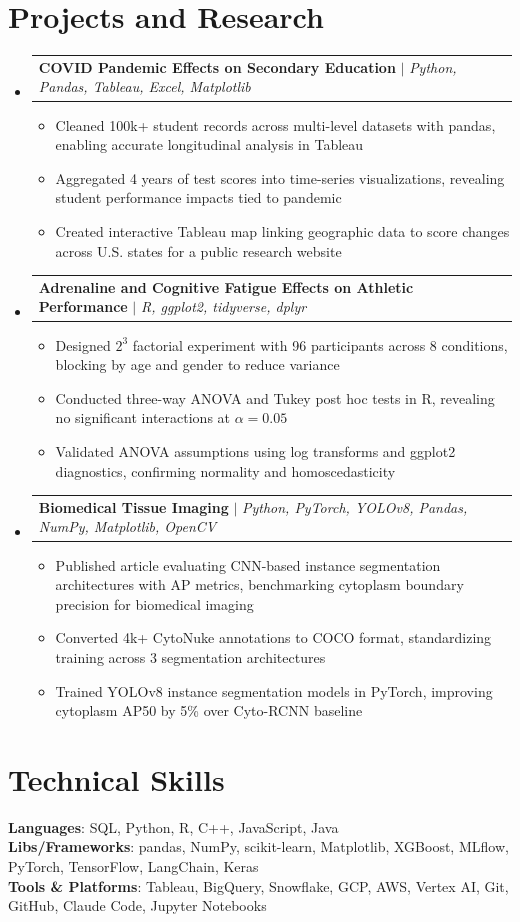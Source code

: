 \documentclass[letterpaper,11pt]{article}
\makeatletter
\newcommand{\resumeItem}[1]{
  \item\small{#1}
}
\newcommand{\resumeProjectHeading}[2]{
    \item
    \begin{tabular*}{\textwidth}{l@{\extracolsep{\fill}}r}
      #1 & #2 \\
    \end{tabular*}\vspace{-7pt}
}
\newcommand{\resumeSubHeadingListStart}{\begin{itemize}[leftmargin=0in, label={}]}
\newcommand{\resumeSubHeadingListEnd}{\end{itemize}}
\newcommand{\resumeItemListStart}{\begin{itemize}[itemsep= 1.5pt, parsep=0pt]}
\newcommand{\resumeItemListEnd}{\end{itemize}\vspace{-5pt}}
\makeatother
\begin{document}
\section{Projects and Research}
    \resumeSubHeadingListStart
      \resumeProjectHeading
          {\textbf{COVID Pandemic Effects on Secondary Education} $|$ \textit{Python, Pandas, Tableau, Excel, Matplotlib}}{}
          \resumeItemListStart
            \resumeItem{Cleaned 100k+ student records across multi-level datasets with pandas, enabling accurate longitudinal analysis in Tableau}
            \resumeItem{Aggregated 4 years of test scores into time-series visualizations, revealing student performance impacts tied to pandemic}
            \resumeItem{Created interactive Tableau map linking geographic data to score changes across U.S. states for a public research website}
          \resumeItemListEnd
      \resumeProjectHeading
          {\textbf{Adrenaline and Cognitive Fatigue Effects on Athletic Performance} $|$ \textit{R, ggplot2, tidyverse, dplyr}}{}
          \resumeItemListStart
            \resumeItem{Designed $2^3$ factorial experiment with 96 participants across 8 conditions, blocking by age and gender to reduce variance}
            \resumeItem{Conducted three-way ANOVA and Tukey post hoc tests in R, revealing no significant interactions at $\alpha = 0.05$}
            \resumeItem{Validated ANOVA assumptions using log transforms and ggplot2 diagnostics, confirming normality and homoscedasticity}
          \resumeItemListEnd
      \resumeProjectHeading
          {\textbf{Biomedical Tissue Imaging} $|$ \textit{Python, PyTorch, YOLOv8, Pandas, NumPy, Matplotlib, OpenCV}}{}
          \resumeItemListStart
            \resumeItem{Published article evaluating CNN-based instance segmentation architectures with AP metrics, benchmarking cytoplasm boundary precision for biomedical imaging}
            \resumeItem{Converted 4k+ CytoNuke annotations to COCO format, standardizing training across 3 segmentation architectures}
            \resumeItem{Trained YOLOv8 instance segmentation models in PyTorch, improving cytoplasm AP50 by 5\% over Cyto-RCNN baseline}
          \resumeItemListEnd
    \resumeSubHeadingListEnd
\section{Technical Skills}
 \begin{itemize}[leftmargin=0in, label={}]
    \small{\item{
     \textbf{Languages}{: SQL, Python, R, C++, JavaScript, Java} \\
     \textbf{Libs/Frameworks}{: pandas, NumPy, scikit-learn, Matplotlib, XGBoost, MLflow, PyTorch, TensorFlow, LangChain, Keras} \\
     \textbf{Tools \& Platforms}{: Tableau, BigQuery, Snowflake, GCP, AWS, Vertex AI, Git, GitHub, Claude Code, Jupyter Notebooks}
    }}
 \end{itemize}
\end{document}
